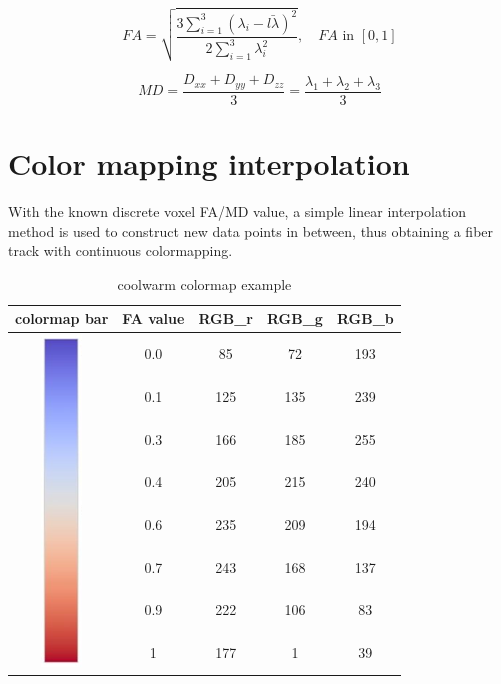 \documentclass[hyperref, plainreport, noproblem]{cgvpub1}
\begin{document}
\begin{equation}
	FA=\sqrt{\frac{3 \sum_{i=1}^{3}(\lambda_i-\bar{l\lambda})^2}{2\sum_{i=1}^3\lambda_i^2}}, \quad FA\text{ in } [0,1]
\end{equation}

\begin{equation}
	MD=\frac{D_{xx}+D_{yy}+D_{zz}}{3}= \frac{\lambda_1+\lambda_2+\lambda_3}{3}
\end{equation}

\section{ Color mapping interpolation }
With the known discrete voxel FA/MD value, a simple linear interpolation method is used to construct new data points in between, thus obtaining a fiber track with continuous colormapping.

\begin{table}[h]
\caption{coolwarm colormap example}
\centering
\begin{tabular}{|c|c|c|c|c|}
\hline
colormap bar     & FA value & RGB\_r & RGB\_g & RGB\_b   \\ \hline
\multirow{8}{*}{\includegraphics{coolwarm_bar} } & 0.0      & 85     & 72     & 193      \\ [5pt] \cline{2-5}
	& 0.1      & 125    & 135    & 239      \\ [6pt] \cline{2-5}
	& 0.3      & 166    & 185    & 255      \\ [6pt] \cline{2-5}
	& 0.4      & 205    & 215    & 240      \\ [6pt] \cline{2-5}
	& 0.6      & 235    & 209    & 194      \\ [6pt] \cline{2-5}
	& 0.7      & 243    & 168    & 137      \\ [6pt] \cline{2-5}
	& 0.9      & 222    & 106    & 83       \\ [6pt] \cline{2-5}
	& 1        & 177    & 1      & 39      \\ [6pt] \hline
\end{tabular}
\label{tbl:coolwarm}
\end{table}
\end{document}
